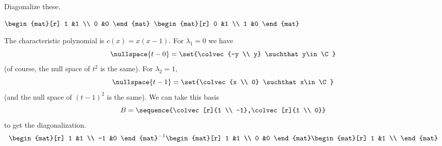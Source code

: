 \begin{exercises}
\begin{answer}
    \end{answer}
  \recommended \item Diagonalize these.
    \begin{exparts*}
       \partsitem \( \begin{mat}[r]
                  1  &1  \\
                  0  &0
                \end{mat}  \)
       \partsitem \( \begin{mat}[r]
                  0  &1  \\
                  1  &0
                \end{mat}  \)
    \end{exparts*}
    \begin{answer}
      \begin{exparts}
        \partsitem The characteristic polynomial is \( c(x)=x(x-1) \).
          For $\lambda_1=0$ we have
          \begin{equation*}
            \nullspace{t-0}=\set{\colvec{-y \\ y}
                                 \suchthat y\in\C }  
          \end{equation*} 
          (of course, the null space of $t^2$ is the same).
          For $\lambda_2=1$,
          \begin{equation*}
            \nullspace{t-1}=\set{\colvec{x \\ 0}
                                     \suchthat x\in\C }  
          \end{equation*}
          (and the null space of $(t-1)^2$ is the same).
          We can take this basis
          \begin{equation*}
            B=\sequence{\colvec[r]{1 \\ -1},\colvec[r]{1 \\ 0}}
          \end{equation*}
          to get the diagonalization.
          \begin{equation*}
            \begin{mat}[r]
              1  &1  \\
             -1  &0
            \end{mat}^{-1}
            \begin{mat}[r]
              1  &1  \\
              0  &0
            \end{mat}
            \begin{mat}[r]
              1  &1  \\

\end{mat}
\end{equation*}
\end{exparts}
\end{answer}
\end{exercises}
